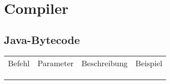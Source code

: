 \chapter{Compiler}
\section{Java-Bytecode}
\begin{table}[]
	\centering
	\label{my-label}
	\begin{tabular}{llll}
		Befehl & Parameter & Beschreibung & Beispiel \\
		&           &              &          \\
		&           &              &          \\
		&           &              &         
	\end{tabular}
\end{table}